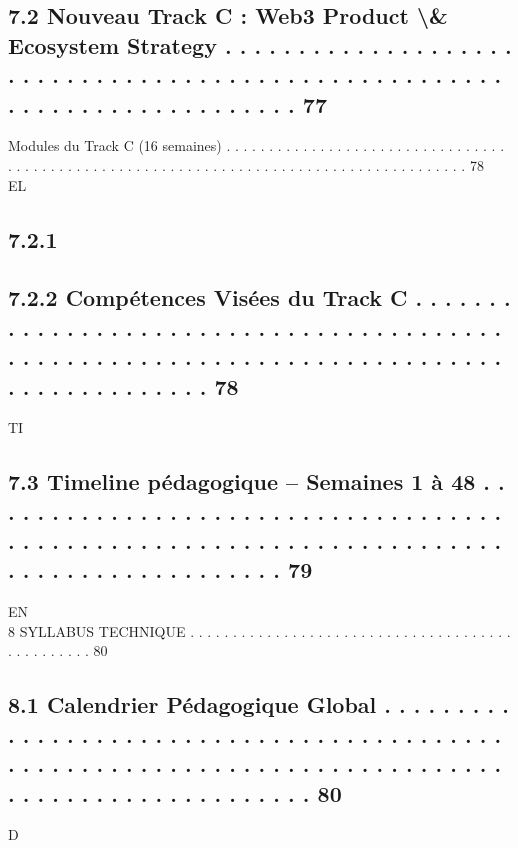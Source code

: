 \documentclass[12pt,landscape,a4paper]{article}
\begin{document}
\subsection{7.2     Nouveau Track C : Web3 Product \textbackslash{}& Ecosystem Strategy . . . . . . . . . . . . . . . . . . . . . . . . . . . . . . . . . . . . . . . . . . . . . . . . . . . . . . . . . . . . . . . . . . . . . . . . . . 77}
Modules du Track C (16 semaines) . . . . . . . . . . . . . . . . . . . . . . . . . . . . . . . . . . . . . . . . . . . . . . . . . . . . . . . . . . . . . . . . . . . . . . . . . . . . . . . . . . . . . . . 78\\
\vspace{0.5em}
\vspace{0.5em}
\vspace{0.5em}
\vspace{0.5em}
EL\\
\subsection{7.2.1}
\subsection{7.2.2              Compétences Visées du Track C . . . . . . . . . . . . . . . . . . . . . . . . . . . . . . . . . . . . . . . . . . . . . . . . . . . . . . . . . . . . . . . . . . . . . . . . . . . . . . . . . . . . . . . . . 78}
\vspace{0.5em}
\vspace{0.5em}
\vspace{0.5em}
\vspace{0.5em}
TI\\
\subsection{7.3     Timeline pédagogique – Semaines 1 à 48 . . . . . . . . . . . . . . . . . . . . . . . . . . . . . . . . . . . . . . . . . . . . . . . . . . . . . . . . . . . . . . . . . . . . . . . . . . . . . . . . . . . . . . . . . 79}
\vspace{0.5em}
\vspace{0.5em}
\vspace{0.5em}
\vspace{0.5em}
EN\\
8     SYLLABUS TECHNIQUE . . . . . . . . . . . . . . . . . . . . . . . . . . . . . . . . . . . . . . . . . . . . . . . . 80\\
\subsection{8.1     Calendrier Pédagogique Global . . . . . . . . . . . . . . . . . . . . . . . . . . . . . . . . . . . . . . . . . . . . . . . . . . . . . . . . . . . . . . . . . . . . . . . . . . . . . . . . . . . . . . . . . . . . . . . . . . 80}
\vspace{0.5em}
\vspace{0.5em}
\vspace{0.5em}
\vspace{0.5em}
D\\
\end{document}
